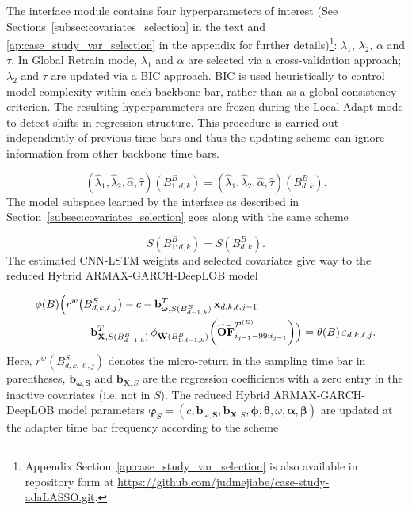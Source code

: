 \documentclass{rQUF2e}
\theoremstyle{plain}
\theoremstyle{definition}
\theoremstyle{remark}
\begin{document}
The interface module contains four hyperparameters of interest (See Sections~\ref{subsec:covariates_selection} in the text and \ref{ap:case_study_var_selection} in the appendix for further details)\footnote{Appendix Section~\ref{ap:case_study_var_selection} is also available in repository form at \url{https://github.com/judmejiabe/case-study-adaLASSO.git}.}: $\lambda_1$, $\lambda_2$, $\alpha$ and $\tau$. In Global Retrain mode, \(\lambda_1\) and \(\alpha\) are selected via a cross-validation approach; \(\lambda_2\) and \(\tau\) are updated via a BIC approach. BIC is used heuristically to control model complexity within each backbone bar, rather than as a global consistency criterion. The resulting hyperparameters are frozen during the Local Adapt mode to detect shifts in regression structure. This procedure is carried out independently of previous time bars and thus the updating scheme can ignore information from other backbone time bars.

$$
(\hat{\lambda}_1, \hat{\lambda}_2, \hat{\alpha}, \hat{\tau})(B^{B}_{1:d, k}) = (\hat{\lambda}_1, \hat{\lambda}_2, \hat{\alpha}, \hat{\tau})(B^{B}_{d, k}).
$$
The model subspace learned by the interface as described in Section~\ref{subsec:covariates_selection} goes along with the same scheme

$$
S(B^B_{1:d, k}) = S(B^B_{d, k}).
$$
The estimated CNN-LSTM weights and selected covariates give way to the reduced Hybrid ARMAX-GARCH-DeepLOB model

\begin{align*}
\phi(B)\Bigl(&r^w\bigl(B^{S}_{d,k,\ell,j}\bigr) - c 
    - \mathbf{b}_{\boldsymbol{\omega}, S(B^B_{d-1,k})}^{T}\,\mathbf{x}_{d,k,\ell,j-1} \notag\\
    &\quad - \mathbf{b}^T_{\mathbf{X}, S(B^B_{d-1,k})}\,
      \phi_{\hat{\mathbf{W}}(B^B_{1:d-1,k})}\!\left(\widetilde{\mathbf{OF}}^{\mathcal{P}^{(E)}}_{i_{j-1}-99:i_{j-1}}\right)
\Bigr) = \theta(B)\,\varepsilon_{d,k,\ell,j}.
\end{align*}
Here, $r^w(B^{S}_{d,k,\ell,j})$ denotes the micro-return in the sampling time bar in parentheses, $\mathbf{b}_{\boldsymbol{\omega, S}}$ and $\mathbf{b}_{\mathbf{X}, S}$ are the regression coefficients with a zero entry in the inactive covariates (i.e. not in $S$). The reduced Hybrid ARMAX-GARCH-DeepLOB model parameters $\boldsymbol{\varphi}_{S} = (c, \mathbf{b}_{\boldsymbol{\omega, S}}, \mathbf{b}_{\mathbf{X}, S}, \boldsymbol{\phi}, \boldsymbol{\theta}, \omega, \boldsymbol{\alpha}, \boldsymbol{\beta})$ are updated at the adapter time bar frequency according to the scheme
\end{document}
